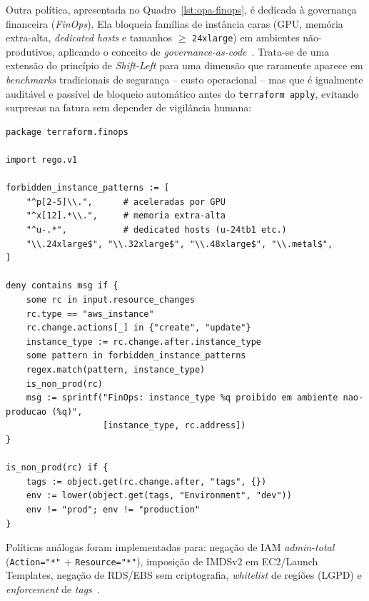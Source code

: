 Outra política, apresentada no Quadro~\ref{lst:opa-finops}, é dedicada à governança financeira (\textit{FinOps}). Ela bloqueia famílias de instância caras (GPU, memória extra-alta, \textit{dedicated hosts} e tamanhos $\geq$ \texttt{24xlarge}) em ambientes não-produtivos, aplicando o conceito de \textit{governance-as-code}~. Trata-se de uma extensão do princípio de \textit{Shift-Left} para uma dimensão que raramente aparece em \textit{benchmarks} tradicionais de segurança -- custo operacional -- mas que é igualmente auditável e passível de bloqueio automático antes do \texttt{terraform apply}, evitando surpresas na fatura sem depender de vigilância humana:

\begin{lstlisting}[language=Rego,caption={Política OPA/Rego \texttt{finops\_instance\_types.rego}: bloqueia \textit{instance types} caros em ambientes não-produtivos.},label={lst:opa-finops}]
package terraform.finops

import rego.v1

forbidden_instance_patterns := [
    "^p[2-5]\\.",      # aceleradas por GPU
    "^x[12].*\\.",     # memoria extra-alta
    "^u-.*",           # dedicated hosts (u-24tb1 etc.)
    "\\.24xlarge$", "\\.32xlarge$", "\\.48xlarge$", "\\.metal$",
]

deny contains msg if {
    some rc in input.resource_changes
    rc.type == "aws_instance"
    rc.change.actions[_] in {"create", "update"}
    instance_type := rc.change.after.instance_type
    some pattern in forbidden_instance_patterns
    regex.match(pattern, instance_type)
    is_non_prod(rc)
    msg := sprintf("FinOps: instance_type %q proibido em ambiente nao-producao (%q)",
                   [instance_type, rc.address])
}

is_non_prod(rc) if {
    tags := object.get(rc.change.after, "tags", {})
    env := lower(object.get(tags, "Environment", "dev"))
    env != "prod"; env != "production"
}
\end{lstlisting}

Políticas análogas foram implementadas para: negação de IAM \textit{admin-total} (\texttt{Action="*"} + \texttt{Resource="*"}), imposição de IMDSv2 em EC2/Launch Templates, negação de RDS/EBS sem criptografia, \textit{whitelist} de regiões (LGPD) e \textit{enforcement} de \textit{tags}~.


